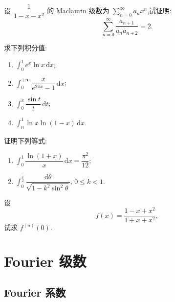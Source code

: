 \documentclass[../数学分析培优讲义.tex]{subfiles}
\begin{document}
\begin{example}
设 $\dfrac{1}{1-x-x^2}$ 的 Maclaurin 级数为 $\displaystyle\sum\limits_{n=0}^{\infty}a_nx^n$,试证明:
\[
    \sum\limits_{n=0}^{\infty}\dfrac{a_{n+1}}{a_na_{n+2}}=2.
\]
\end{example}
\exampleblank


\newpage


\begin{example}
求下列积分值:
\begin{enumerate}[label=(\arabic*)]
    \item $\displaystyle\int_0^1e^x\ln x\,\mathrm{d}x$;
    \item $\displaystyle\int_0^{+\infty}\dfrac{x}{e^{2\pi x}-1}\,\mathrm{d}x$;
    \item $\displaystyle\int_0^x\dfrac{\sin t}{t}\,\mathrm{d}t$;
    \item $\displaystyle\int_0^1\ln x\ln(1-x)\,\mathrm{d}x$.
\end{enumerate}
\end{example}
\exampleblank

\begin{example}
证明下列等式:
\begin{enumerate}[label=(\arabic*)]
    \item $\displaystyle\int_0^1\dfrac{\ln(1+x)}{x}\,\mathrm{d}x=\dfrac{\pi^2}{12}$;
    \item $\displaystyle\int_0^{\frac{\pi}{2}}\dfrac{\mathrm{d}\theta}{\sqrt{1-k^2\sin^2\theta}}$, $0\leq k<1$.
\end{enumerate}
\end{example}
\exampleblank


\newpage


\begin{example}
设
\[
    f(x)=\dfrac{1-x+x^2}{1+x+x^2},
\]
试求 $f^{(n)}(0)$.
\end{example}
\exampleblank


\newpage

\section{Fourier 级数}


\subsection{Fourier 系数}
\end{document}
